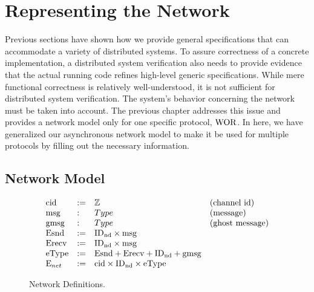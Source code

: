 \section{Representing the Network}
\label{chapter:witnesspassing:sec:low-level-implementation}


Previous sections have shown how we provide general specifications
that can accommodate a variety of distributed systems.  To assure correctness of a concrete implementation, a distributed system verification also needs to
provide evidence that the actual running code refines high-level generic
specifications. While mere functional correctness is relatively well-understood,
it is not sufficient for distributed system verification. The
system's behavior concerning the network must be taken into account. 
The previous chapter addresses this issue and 
provides a network model only for one specific protocol, $\mathrm{WOR}$. 
In here, we have generalized our asynchronous network model to make it be used 
for multiple protocols by filling out the necessary information. 



\subsection{Network Model}
\label{chapter:witnesspassing:subsec:network-model}

\begin{figure}
\begin{small}
\raggedright
$$
\begin{array}{llll}
\mathrm{cid} & := & \mathbb{Z} & \mbox{(channel id)} \\
\mathrm{msg} & : & Type & \mbox{(message)} \\
\mathrm{gmsg} & : & Type & \mbox{(ghost message)} \\
\mathrm{Esnd} & := & \mathrm{ID_{nd}} \times \mathrm{msg} \\
\mathrm{Erecv} & := & \mathrm{ID_{nd}} \times \mathrm{msg} \\
\mathrm{eType} & := & \mathrm{Esnd} + \mathrm{Erecv} + \mathrm{ID_{nd}} + \mathrm{gmsg} \\
\mathrm{E}_{net} & := & \mathrm{cid} \times \mathrm{ID_{nd}} \times \mathrm{eType} \\
\end{array}
$$
\end{small}
\caption{Network Definitions.}
\label{fig:chapter:witnesspassing:net-defs}
\end{figure}


